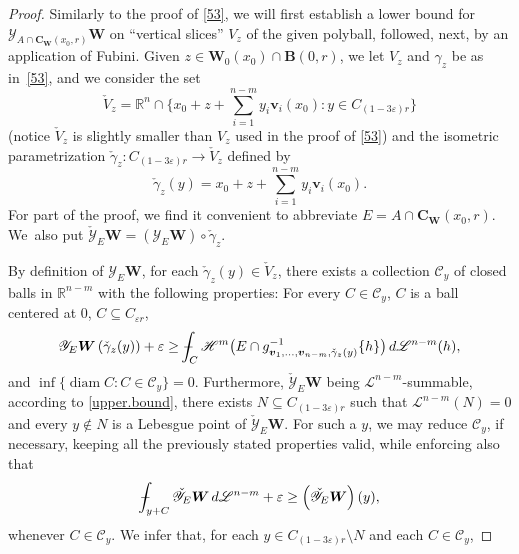 \documentclass[JEP,XML,SOM,Unicode,ThmDefs,NoEqCountersInSection]{cedram}
\newcommand{\R}{\mathbb{R}}
\newcommand{\Rn}{\R^n}
\newcommand{\calC}{\mathscr{C}}
\newcommand{\calH}{\mathscr{H}}
\newcommand{\calL}{\mathscr{L}}
\newcommand{\calY}{\mathscr{Y}}
\newcommand{\bB}{{\boldsymbol{B}}}
\newcommand{\bC}{{\boldsymbol{C}}}
\newcommand{\bW}{{\boldsymbol{W}}}
\newcommand{\bv}{{\boldsymbol{v}}}
\DeclareMathOperator{\rmdiam}{\mathrm{diam}}
\def\Xint#1{\mathchoice
{\XXint\displaystyle\textstyle{#1}}{\XXint\textstyle\scriptstyle{#1}}{\XXint\scriptstyle\scriptscriptstyle{#1}}{\XXint\scriptscriptstyle
\scriptscriptstyle{#1}}\!\int}
\def\XXint#1#2#3{{\setbox0=\hbox{$#1{#2#3}{\int}$}
\vcenter{\hbox{$#2#3$}}\kern-.5\wd0}}
\def\dashint{\Xint-}
\let\veps\varepsilon
\let\subset\subseteq
\begin{document}
\begin{proof}
Similarly to the proof of \ref{53}, we will first establish a lower bound for $\calY_{A \cap \bC_\bW(x_0,r)} \bW$ on ``vertical slices'' $V_z$ of the given polyball, followed, next, by an application of Fubini.
Given $z \in \bW_0(x_0) \cap \bB(0,r)$, we let $V_z$ and $\gamma_z$ be as in~\ref{53}, and we consider the set\vspace*{-3pt}
\begin{equation*}
\check{V}_z = \Rn \cap \bigl\{ x_0 + z + \textstyle\sum_{i=1}^{n-m} y_i \bv_i(x_0): y \in C_{(1-3\veps)r}\bigr\}
\end{equation*}
(notice $\check{V}_z$ is slightly smaller than $V_z$ used in the proof of \ref{53}) and the isometric parametrization $\check{\gamma}_z: C_{(1-3\veps)r} \to \check{V}_z$ defined by\vspace*{-3pt}
\begin{equation*}
\check{\gamma}_z(y) = x_0 + z + \sum_{i=1}^{n-m} y_i \bv_i(x_0).
\end{equation*}
For part of the proof, we find it convenient to abbreviate $E = A \cap \bC_\bW(x_0,r)$.
We~also put $\check {\calY}_{E} \bW = \left(\calY_{E} \bW \right) \circ \check{\gamma}_z$.
\par
By definition of $\calY_E \bW$, for each $\check{\gamma}_z(y) \in \check{V}_z$, there exists a collection $\calC_y$ of closed balls in $\R^{n-m}$ with the following properties: For every $C \in \calC_y$, $C$ is a ball centered at 0, $C \subset C_{\veps r}$,\vspace*{-3pt}
\begin{equation*}
\calY_E \bW \left(\check{\gamma}_z(y) \right) + \veps \geq \dashint_C \calH^m \bigl(E \cap g_{\bv_1,\ldots,\bv_{n-m},\check{\gamma}_z(y)}^{-1}\{h\} \bigr) \,d\calL^{n-m}(h),
\end{equation*}
and $\inf \{ \rmdiam C: C \in \calC_y \} = 0$.
Furthermore, $\check{\calY}_E \bW$ being $\calL^{n-m}$-summable, according to \ref{upper.bound}, there exists $N \subset C_{(1-3\veps)r}$ such that $\calL^{n-m}(N)=0$ and every $y \not \in N$ is a Lebesgue point of $\check{\calY}_E \bW$.
For such a $y$, we may reduce $\calC_y$, if necessary, keeping all the previously stated properties valid, while enforcing also that
\begin{equation*}
\dashint_{y+C} \check{\calY}_E \bW \,d\calL^{n-m} + \veps \geq \left(\check{\calY}_E \bW \right)(y),
\end{equation*}
whenever $C \in \calC_y$.
We infer that, for each $y \in C_{(1-3\veps)r} \setminus N$ and each $C \in \calC_y$,\vspace*{-5pt}

\end{proof}
\end{document}
